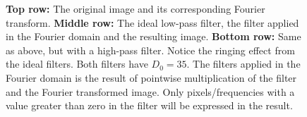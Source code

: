 \documentclass[a4paper, 10pt, final]{article}
\begin{document}
\begin{figure}[!h]
    \hspace{1em}
    \caption[]{\textbf{Top row:} The original image and its
    corresponding Fourier transform. \textbf{Middle row:} The ideal
    low-pass filter, the filter applied in the Fourier domain and the
    resulting image. \textbf{Bottom row:} Same as above, but with a
    high-pass filter. Notice the ringing effect from the ideal filters.
    Both filters have $D_0 = 35$. The filters applied in the Fourier
    domain is the result of pointwise multiplication of the filter and
    the Fourier transformed image. Only pixels/frequencies with a value greater than
    zero in the filter will be expressed in the result.}
    \label{ideal}
\end{figure}
\end{document}
